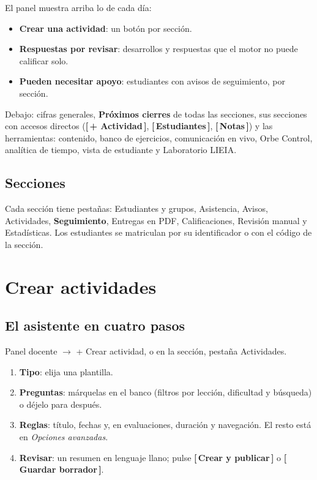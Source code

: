 \documentclass[11pt,a4paper,oneside]{book}
\newcommand{\boton}[1]{\textsf{\textbf{[\,#1\,]}}}
\newcommand{\ruta}[1]{\textsf{#1}}
\begin{document}
El panel muestra arriba lo de cada día:
\begin{itemize}
  \item \textbf{Crear una actividad}: un botón por sección.
  \item \textbf{Respuestas por revisar}: desarrollos y respuestas que el motor no puede calificar solo.
  \item \textbf{Pueden necesitar apoyo}: estudiantes con avisos de seguimiento, por sección.
\end{itemize}
Debajo: cifras generales, \textbf{Próximos cierres} de todas las secciones, sus secciones con accesos directos
(\boton{+ Actividad}, \boton{Estudiantes}, \boton{Notas}) y las herramientas: contenido, banco de ejercicios,
comunicación en vivo, Orbe Control, analítica de tiempo, vista de estudiante y Laboratorio LIEIA.

\section{Secciones}
Cada sección tiene pestañas: Estudiantes y grupos, Asistencia, Avisos, Actividades, \textbf{Seguimiento}, Entregas en
PDF, Calificaciones, Revisión manual y Estadísticas. Los estudiantes se matriculan por su identificador o con el
código de la sección.

\chapter{Crear actividades}

\section{El asistente en cuatro pasos}
\ruta{Panel docente $\rightarrow$ + Crear actividad}, o en la sección, pestaña Actividades.

\begin{enumerate}[label=\textbf{\arabic*.}]
  \item \textbf{Tipo}: elija una plantilla.
  \item \textbf{Preguntas}: márquelas en el banco (filtros por lección, dificultad y búsqueda) o déjelo para después.
  \item \textbf{Reglas}: título, fechas y, en evaluaciones, duración y navegación. El resto está en
        \emph{Opciones avanzadas}.
  \item \textbf{Revisar}: un resumen en lenguaje llano; pulse \boton{Crear y publicar} o \boton{Guardar borrador}.
\end{enumerate}
\end{document}
